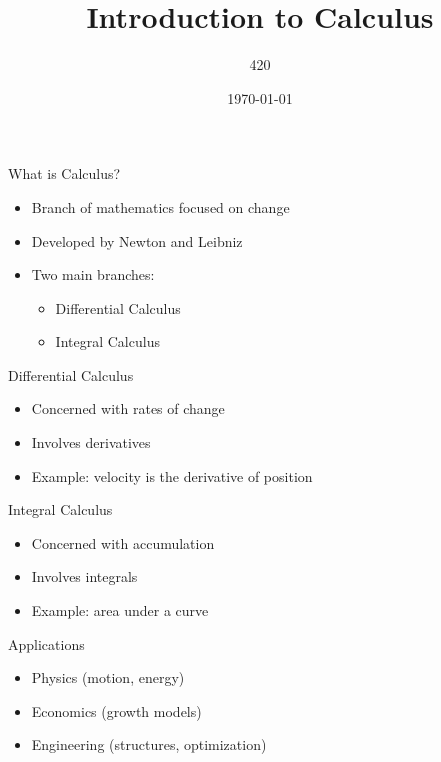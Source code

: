 \documentclass{beamer}
\title{Introduction to Calculus}
\author{420}
\date{\today}
\begin{document}
\frame{\titlepage}

\begin{frame}{What is Calculus?}
\begin{itemize}
    \item Branch of mathematics focused on change
    \item Developed by Newton and Leibniz
    \item Two main branches:
    \begin{itemize}
        \item Differential Calculus
        \item Integral Calculus
    \end{itemize}
\end{itemize}
\end{frame}

\begin{frame}{Differential Calculus}
\begin{itemize}
    \item Concerned with rates of change
    \item Involves derivatives
    \item Example: velocity is the derivative of position
\end{itemize}
\end{frame}

\begin{frame}{Integral Calculus}
\begin{itemize}
    \item Concerned with accumulation
    \item Involves integrals
    \item Example: area under a curve
\end{itemize}
\end{frame}

\begin{frame}{Applications}
\begin{itemize}
    \item Physics (motion, energy)
    \item Economics (growth models)
    \item Engineering (structures, optimization)
\end{itemize}
\end{frame}
\end{document}
